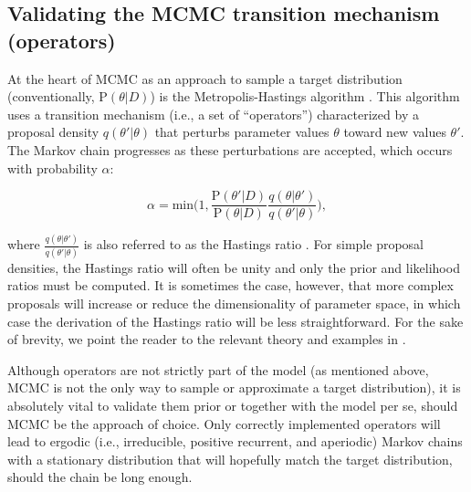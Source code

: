 \documentclass[oneside]{article}
\begin{document}

\subsection*{Validating the MCMC transition mechanism (operators)}

At the heart of MCMC as an approach to sample a target distribution
(conventionally, $\text{P}(\theta|D)$) is
the Metropolis-Hastings algorithm \citep{metropolis53,mh}.
This algorithm uses a transition mechanism (i.e., a set of
``operators'') characterized by a proposal density $q(\theta'|\theta)$
that perturbs parameter values $\theta$ toward new values $\theta'$.
The Markov chain progresses as these perturbations are accepted, which
occurs with probability $\alpha$:

\begin{equation}
  \alpha = \text{min}\bigg(1, \frac{\text{P}(\theta'|D)}{\text{P}(\theta|D)} \frac{q(\theta|\theta')}{q(\theta'|\theta)} \bigg),
\end{equation}

\noindent where $\frac{q(\theta|\theta')}{q(\theta'|\theta)}$ is also
referred to as the Hastings ratio \citep{smith93,tierney94,gelman}.
For simple proposal densities, the Hastings ratio will often be unity and
only the prior and likelihood ratios must be computed.
It is sometimes the case, however, that more complex proposals will
increase or reduce the dimensionality of parameter space, in which
case the derivation of the Hastings ratio will be less straightforward.
For the sake of brevity, we point the reader to the relevant theory
and examples in \citep{green95,huelsenbeck04,drummond10}.

Although operators are not strictly part of the model (as mentioned
above, MCMC is not the only way to sample or approximate a target
distribution), it is absolutely vital to validate them prior or
together with the model per se, should MCMC be the approach of choice.
Only correctly implemented operators will lead to ergodic (i.e.,
irreducible, positive recurrent, and aperiodic) Markov
chains with a stationary distribution that will hopefully match
the target distribution, should the chain be long enough.
\end{document}
